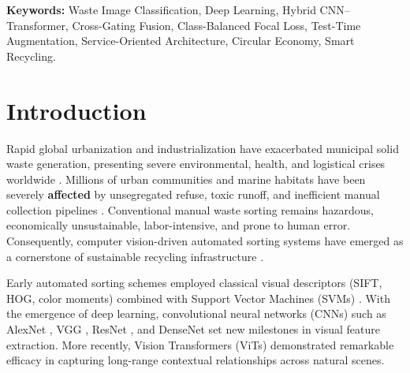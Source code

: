 \documentclass[11pt,a4paper]{article}
\begin{document}
\noindent\textbf{Keywords:} Waste Image Classification, Deep Learning, Hybrid CNN--Transformer, Cross-Gating Fusion, Class-Balanced Focal Loss, Test-Time Augmentation, Service-Oriented Architecture, Circular Economy, Smart Recycling.

\section{Introduction}
Rapid global urbanization and industrialization have exacerbated municipal solid waste generation, presenting severe environmental, health, and logistical crises worldwide \cite{adedeji2019, chouhan2020}. Millions of urban communities and marine habitats have been severely \textbf{affected} by unsegregated refuse, toxic runoff, and inefficient manual collection pipelines \cite{bircanoglu2018, ruiz2019}. Conventional manual waste sorting remains hazardous, economically unsustainable, labor-intensive, and prone to human error. Consequently, computer vision-driven automated sorting systems have emerged as a cornerstone of sustainable recycling infrastructure \cite{thung2016, utku2026}.

Early automated sorting schemes employed classical visual descriptors (SIFT, HOG, color moments) combined with Support Vector Machines (SVMs) \cite{thung2016}. With the emergence of deep learning, convolutional neural networks (CNNs) such as AlexNet \cite{krizhevsky2012}, VGG \cite{simonyan2014}, ResNet \cite{he2016}, and DenseNet \cite{huang2017} set new milestones in visual feature extraction. More recently, Vision Transformers (ViTs) \cite{vaswani2017, dosovitskiy2020} demonstrated remarkable efficacy in capturing long-range contextual relationships across natural scenes.
\end{document}
